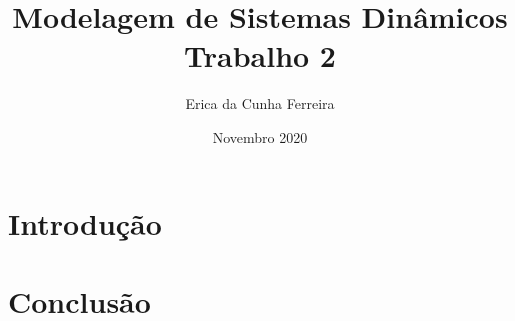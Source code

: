 \documentclass[12pt]{article}
\title{%
    Modelagem de Sistemas Dinâmicos\\ %
    \large Trabalho 2}
\author{Erica da Cunha Ferreira }
\date{Novembro 2020}
\begin{document}
\maketitle
{} 

\newpage
\tableofcontents
\newpage
{} 

\cleardoublepage{}
\section{Introdução}

\section{Conclusão}
\end{document}
